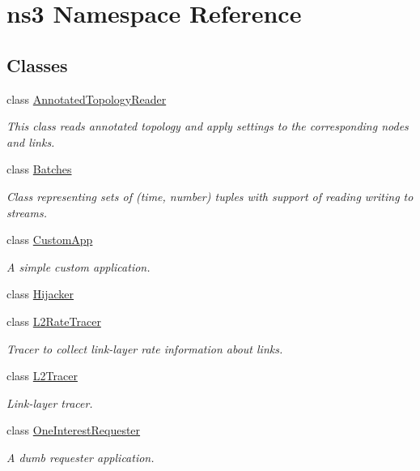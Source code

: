 \hypertarget{namespacens3}{}\section{ns3 Namespace Reference}
\label{namespacens3}
\subsection*{Classes}
\begin{DoxyCompactItemize}
\item 
class \hyperlink{classns3_1_1AnnotatedTopologyReader}{Annotated\+Topology\+Reader}
\begin{DoxyCompactList}\small\item\em This class reads annotated topology and apply settings to the corresponding nodes and links. \end{DoxyCompactList}\item 
class \hyperlink{classns3_1_1Batches}{Batches}
\begin{DoxyCompactList}\small\item\em Class representing sets of (time, number) tuples with support of reading writing to streams. \end{DoxyCompactList}\item 
class \hyperlink{classns3_1_1CustomApp}{Custom\+App}
\begin{DoxyCompactList}\small\item\em A simple custom application. \end{DoxyCompactList}\item 
class \hyperlink{classns3_1_1Hijacker}{Hijacker}
\item 
class \hyperlink{classns3_1_1L2RateTracer}{L2\+Rate\+Tracer}
\begin{DoxyCompactList}\small\item\em Tracer to collect link-\/layer rate information about links. \end{DoxyCompactList}\item 
class \hyperlink{classns3_1_1L2Tracer}{L2\+Tracer}
\begin{DoxyCompactList}\small\item\em Link-\/layer tracer. \end{DoxyCompactList}\item 
class \hyperlink{classns3_1_1OneInterestRequester}{One\+Interest\+Requester}
\begin{DoxyCompactList}\small\item\em A dumb requester application. \end{DoxyCompactList}\item 

\end{DoxyCompactItemize}
